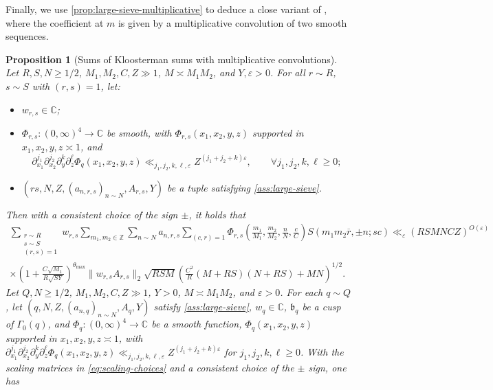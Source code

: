 \documentclass[reqno,11pt]{amsart}
\newtheorem{proposition}[theorem]{Proposition}
\theoremstyle{remark}
\numberwithin{equation}{section}
\newcommand{\Z}{\mathbb{Z}}
\newcommand{\C}{\mathbb{C}}
\newcommand{\mb}{\mathfrak{b}}
\newcommand{\eps}{\varepsilon}
\renewcommand{\bar}{\overline}
\begin{document}
Finally, we use \cref{prop:large-sieve-multiplicative} to deduce a close variant of \cite[Corollary 17]{pascadi2024large}, where the coefficient at $m$ is given by a multiplicative convolution of two smooth sequences.

\begin{proposition}[Sums of Kloosterman sums with multiplicative convolutions] \label{prop:kloosterman-complete}
Let $R, S, N \ge 1/2$, $M_1, M_2, C, Z \gg 1$, $M \asymp M_1 M_2$, and $Y, \eps > 0$. For all $r \sim R$, $s \sim S$ with $(r, s) = 1$, let:
\begin{itemize} 
    \item $w_{r,s} \in \C$; 
    \item $\Phi_{r,s} : (0, \infty)^4 \to \C$ be smooth, with $\Phi_{r,s}(x_1, x_2, y, z)$ supported in $x_1, x_2, y, z \asymp 1$, and
    \[ 
        \partial_{x_1}^{j_1} \partial_{x_2}^{j_2} \partial_y^k \partial_z^\ell \Phi_q(x_1, x_2, y, z) \ll_{j_1,j_2,k,\ell,\eps} Z^{(j_1+j_2+k)\eps},
        \qquad 
        \forall j_1, j_2, k, \ell \ge 0;
    \]
    \item $(rs, N, Z, (a_{n,r,s})_{n \sim N}, A_{r,s}, Y)$ be a tuple satisfying \cref{ass:large-sieve}.
\end{itemize} 
Then with a consistent choice of the sign $\pm$, it holds that
\begin{equation} \label{eq:kloosterman-rsm12nc}
\begin{aligned}
    \sum_{\substack{r \sim R \\ s \sim S \\ (r, s) = 1}} w_{r,s} \sum_{m_1, m_2 \in \Z} 
    \sum_{n \sim N} a_{n,r,s}
    \sum_{(c, r) = 1} \Phi_{r,s}\left(\frac{m_1}{M_1}, \frac{m_2}{M_2}, \frac{n}{N}, \frac{c}{C}\right) S(m_1m_2\bar{r}, \pm n; sc)
    \ll_\eps
    (RSMNCZ)^{O(\eps)}
    \\
    \times 
    \left(1 + \frac{C \sqrt{M_1}}{R \sqrt{SY}}\right)^{\theta_{\max}} 
    \|w_{r,s} A_{r,s}\|_2 \sqrt{RSM}
    \left(\frac{C^2}{R} (M + RS)(N + RS) + MN \right)^{1/2}.
\end{aligned}
\end{equation}
\iffalse
Let $Q, N \ge 1/2$, $M_1, M_2, C, Z \gg 1$, $Y > 0$, $M \asymp M_1 M_2$, and $\eps > 0$. For each $q \sim Q$, let $(q, N, Z, (a_{n,q})_{n \sim N}, A_q, Y)$ satisfy \cref{ass:large-sieve}, $w_q \in \C$, $\mb_q$ be a cusp of $\Gamma_0(q)$, and $\Phi_q : (0, \infty)^4 \to \C$ be a smooth function, $\Phi_q(x_1, x_2, y, z)$ supported in $x_1, x_2, y, z \asymp 1$, with $\partial_{x_1}^{j_1} \partial_{x_2}^{j_2} \partial_y^k \partial_z^\ell \Phi_q(x_1, x_2, y, z) \ll_{j_1,j_2,k,\ell,\eps} Z^{(j_1+j_2+k)\eps}$ for $j_1, j_2, k, \ell \ge 0$. With the scaling matrices in \cref{eq:scaling-choices} and a consistent choice of the $\pm$ sign, one has

\end{proposition}
\end{document}
